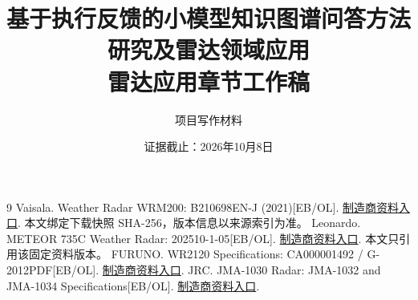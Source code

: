 \documentclass[UTF8,a4paper,12pt]{ctexrep}
\title{基于执行反馈的小模型知识图谱问答方法研究及雷达领域应用\\雷达应用章节工作稿}
\author{项目写作材料}
\date{证据截止：2026年10月8日}
\begin{document}
\maketitle
\tableofcontents
\setcounter{chapter}{5}

\begin{thebibliography}{9}
Vaisala. Weather Radar WRM200: B210698EN-J (2021)[EB/OL].
\href{https://www.vaisala.com/sites/default/files/documents/WRM200-Datasheet-B210698EN.pdf}{制造商资料入口}.
本文绑定下载快照 SHA-256，版本信息以来源索引为准。
Leonardo. METEOR 735C Weather Radar: 202510-1-05[EB/OL].
\href{https://electronics.leonardo.com/documents/16277707/18380759/METEOR\%2B735C_202510-1-05.pdf/af4363a1-5aa9-55d4-b371-355f20c9f01e?t=1759766404970}{制造商资料入口}.
本文只引用该固定资料版本。
FURUNO. WR2120 Specifications: CA000001492 / G-2012PDF[EB/OL].
\href{https://www.furuno.com/files/Brochure/WR2120_en_1911.pdf}{制造商资料入口}.
JRC. JMA-1030 Radar: JMA-1032 and JMA-1034 Specifications[EB/OL].
\href{https://www.jrc.co.jp/hubfs/jrc-corp/assets/pdf/en/product/jma1030_e_v2.pdf}{制造商资料入口}.
\end{thebibliography}
\end{document}
